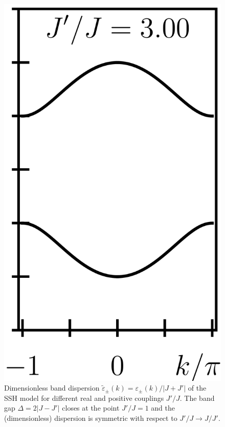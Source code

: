 \begin{figure}[ht]
    \includegraphics{figures/cropped_ssh_dispersion_3.png}
    \caption{Dimensionless band dispersion $\tilde\varepsilon_\pm(k)=\varepsilon_\pm(k)/|J+J'|$ of the SSH model for different real and positive couplings $J'/J$. The band gap $\Delta=2|J-J'|$ closes at the point $J'/J=1$ and the (dimensionless) dispersion is symmetric with respect to $J'/J\rightarrow J/J'$.}
    \label{fig:ssh_dispersion}
\end{figure}

